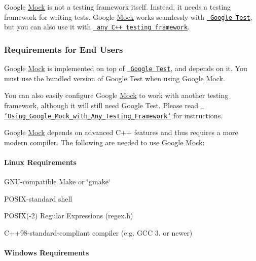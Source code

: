 Google \mbox{\hyperlink{class_mock}{Mock}} is not a testing framework itself. Instead, it needs a testing framework for writing tests. Google \mbox{\hyperlink{class_mock}{Mock}} works seamlessly with \href{http://code.google.com/p/googletest/}\texttt{ Google Test}, but you can also use it with \href{googlemock/ForDummies.md#Using_Google_Mock_with_Any_Testing_Framework}\texttt{ any C++ testing framework}.

\subsubsection*{Requirements for End Users}

Google \mbox{\hyperlink{class_mock}{Mock}} is implemented on top of \href{http://github.com/google/googletest/}\texttt{ Google Test}, and depends on it. You must use the bundled version of Google Test when using Google \mbox{\hyperlink{class_mock}{Mock}}.

You can also easily configure Google \mbox{\hyperlink{class_mock}{Mock}} to work with another testing framework, although it will still need Google Test. Please read \href{docs/ForDummies.md#Using_Google_Mock_with_Any_Testing_Framework}\texttt{ \char`\"{}\+Using\+\_\+\+Google\+\_\+\+Mock\+\_\+with\+\_\+\+Any\+\_\+\+Testing\+\_\+\+Framework\char`\"{}} for instructions.

Google \mbox{\hyperlink{class_mock}{Mock}} depends on advanced C++ features and thus requires a more modern compiler. The following are needed to use Google \mbox{\hyperlink{class_mock}{Mock}}\+:

\paragraph*{Linux Requirements}


\begin{DoxyItemize}
\item G\+N\+U-\/compatible Make or \char`\"{}gmake\char`\"{}
\item P\+O\+S\+I\+X-\/standard shell
\item P\+O\+S\+IX(-\/2) Regular Expressions (regex.\+h)
\item C++98-\/standard-\/compliant compiler (e.\+g. G\+CC 3. or newer)
\end{DoxyItemize}

\paragraph*{Windows Requirements}



